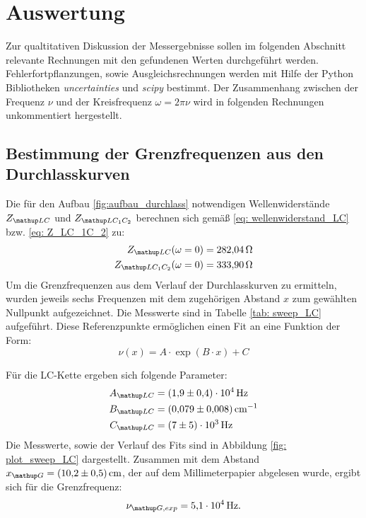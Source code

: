 \section{Auswertung}
Zur qualtitativen Diskussion der Messergebnisse sollen im folgenden Abschnitt relevante Rechnungen mit den gefundenen
Werten durchgeführt werden. Fehlerfortpflanzungen, sowie Ausgleichsrechnungen werden mit
Hilfe der Python Bibliotheken \emph{uncertainties}\cite{uncertainties} und \emph{scipy}\cite{scipy} bestimmt. Der Zusammenhang zwischen
der Frequenz $\nu$ und der Kreisfrequenz $\omega = 2\pi\nu$ wird in folgenden Rechnungen unkommentiert hergestellt.
\subsection{Bestimmung der Grenzfrequenzen aus den Durchlasskurven}
Die für den Aufbau \ref{fig:aufbau_durchlass} notwendigen Wellenwiderstände $Z\ua{LC}$ und $Z\ua{LC_1C_2}$ berechnen sich gemäß \eqref{eq: wellenwiderstand_LC} bzw. \eqref{eq: Z_LC_1C_2} zu:
\begin{align}
  Z\ua{LC}(\omega=0) &= \SI{282.04}{\ohm}\\
  Z\ua{LC_1C_2}(\omega=0) &= \SI{333.90}{\ohm}
  \label{eq: wellenwiderstand_zahlenwert}
\end{align}
Um die Grenzfrequenzen aus dem Verlauf der Durchlasskurven zu ermitteln, wurden jeweils sechs
Frequenzen mit dem zugehörigen Abstand $x$ zum gewählten Nullpunkt aufgezeichnet. Die Messwerte
sind in Tabelle \ref{tab: sweep_LC} aufgeführt. Diese Referenzpunkte ermöglichen einen Fit an eine Funktion der Form:
\begin{equation}
  \nu(x) = A \cdot \exp(B\cdot x) + C
  \label{eq: exp_fit}
\end{equation}
\FloatBarrier

Für die LC-Kette ergeben sich folgende Parameter:
\begin{align}
  \begin{aligned}
    A\ua{LC} &= \SI{1.9(4)e4}{\hertz}\\
    B\ua{LC} &= \SI{0.079(8)}{\cm^{-1}}\\
    C\ua{LC} &= \SI{7(5)e3}{\hertz}
  \end{aligned}
  \label{eq: params_LC}
\end{align}
Die Messwerte, sowie der Verlauf des Fits sind in Abbildung \ref{fig: plot_sweep_LC} dargestellt. Zusammen
mit dem Abstand $x\ua{G} = \SI{10.2(5)}{cm}$, der auf dem Millimeterpapier abgelesen wurde, ergibt sich
für die Grenzfrequenz:
\begin{equation}
  \nu\ua{G, exp} = \SI{5.1e4}{\hertz}.
  \label{eq: nu_g_LC}
\end{equation}
